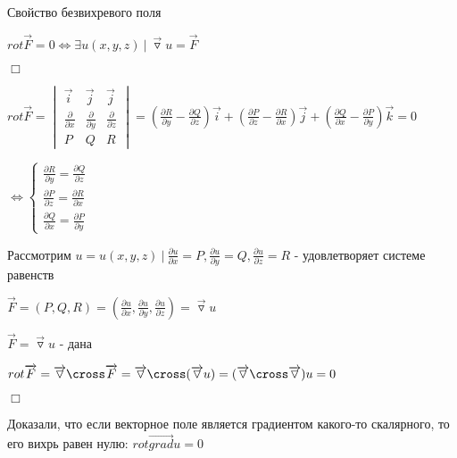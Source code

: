 \documentclass[12pt]{article}
\begin{document}
     Свойство безвихревого поля

    $rot \overrightarrow{F} = 0 \Longleftrightarrow \exists u(x, y, z) \ | \ \overrightarrow{\triangledown}u = \overrightarrow{F}$

    $\Box$ \fbox{\Longrightarrow}

    $\displaystyle rot \overrightarrow{F} =
    \begin{vmatrix}
        \overrightarrow{i}          & \overrightarrow{j}          & \overrightarrow{j}          \\
        \frac{\partial}{\partial x} & \frac{\partial}{\partial y} & \frac{\partial}{\partial z} \\
        P & Q & R
    \end{vmatrix} = (\frac{\partial R}{\partial y} - \frac{\partial Q}{\partial z})\overrightarrow{i} + (\frac{\partial P}{\partial z} - \frac{\partial R}{\partial x})\overrightarrow{j} + (\frac{\partial Q}{\partial x} - \frac{\partial P}{\partial y})\overrightarrow{k} = 0$

    $\displaystyle \Longleftrightarrow
    \begin{cases}
        \frac{\partial R}{\partial y} = \frac{\partial Q}{\partial z} \\
        \frac{\partial P}{\partial z} = \frac{\partial R}{\partial x} \\
        \frac{\partial Q}{\partial x} = \frac{\partial P}{\partial y}
    \end{cases}$

    Рассмотрим $\displaystyle u = u(x, y, z) \ | \ \frac{\partial u}{\partial x} = P, \frac{\partial u}{\partial y} = Q, \frac{\partial u}{\partial z} = R$ - удовлетворяет системе равенств

    $\displaystyle \overrightarrow{F} = (P, Q, R) = (\frac{\partial u}{\partial x}, \frac{\partial u}{\partial y}, \frac{\partial u}{\partial z}) = \overrightarrow{\triangledown} u$

    \fbox{\Longleftarrow} $\overrightarrow{F} = \overrightarrow{\triangledown}u$ - дана

    $rot \overrightarrow{F} = \overrightarrow{\triangledown} \cross \overrightarrow{F} = \overrightarrow{\triangledown} \cross (\overrightarrow{\triangledown} u) = (\overrightarrow{\triangledown} \cross \overrightarrow{\triangledown}) u = 0$

    $\Box$

    \Nota Доказали, что если векторное поле является градиентом какого-то скалярного, то его вихрь равен нулю: $rot \overrightarrow{grad} u = 0$
\end{document}
